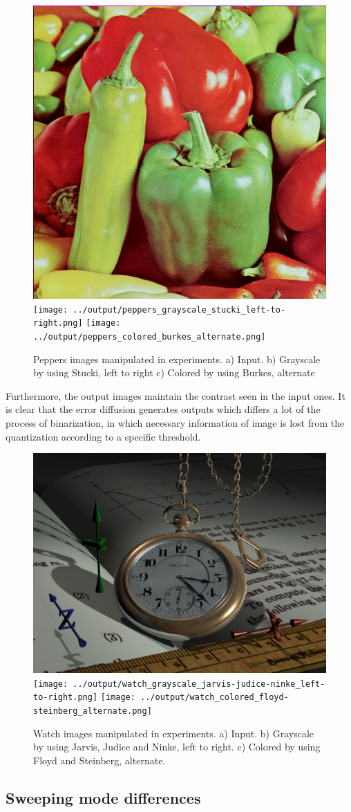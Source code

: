 \documentclass[]{IEEEtran}
\begin{document}
\begin{figure}[H]
  \centering
  \includegraphics[width=0.4\hsize]{../input/peppers_colored.png}
  \texttt{[image: ../output/peppers\_grayscale\_stucki\_left-to-right.png]}
  \texttt{[image: ../output/peppers\_colored\_burkes\_alternate.png]}
  \caption{Peppers images manipulated in experiments. a) Input. b) Grayscale by using Stucki, left to right c) Colored by using Burkes, alternate }
  \label{fig:effect-peppers}
\end{figure}

Furthermore, the output images maintain the contrast seen in the input ones. It is clear that the error diffusion generates outputs which differs a lot of the process of binarization, in which necessary information of image is lost from the quantization according to a specific threshold. 

\begin{figure}[H]
  \centering
  \includegraphics[width=0.4\hsize]{../input/watch_colored.png}
  \texttt{[image: ../output/watch\_grayscale\_jarvis-judice-ninke\_left-to-right.png]}
  \texttt{[image: ../output/watch\_colored\_floyd-steinberg\_alternate.png]}
  \caption{Watch images manipulated in experiments. a) Input. b) Grayscale by using Jarvis, Judice and Ninke, left to right. c) Colored by using Floyd and Steinberg, alternate. }
  \label{fig:effect-watch}
\end{figure}

\subsection{Sweeping mode differences}
\end{document}
